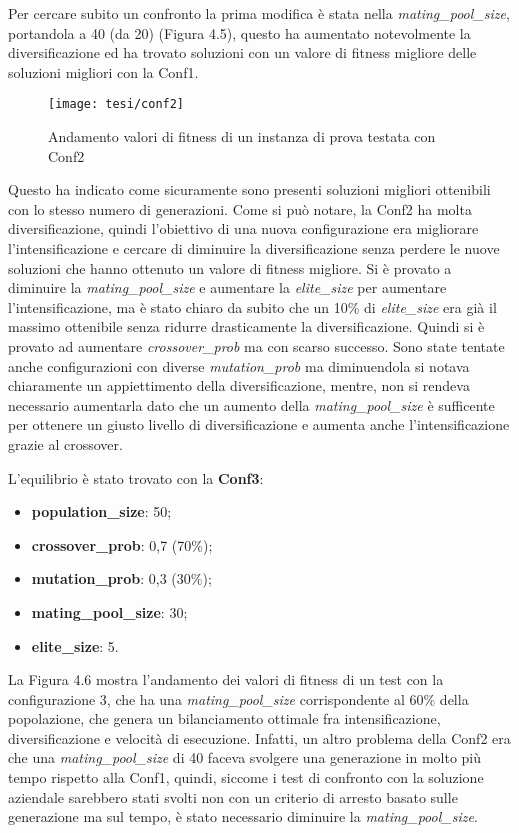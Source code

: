 Per cercare subito un confronto la prima modifica è stata nella \emph{mating\_pool\_size}, portandola a 40 (da 20) (Figura 4.5), questo ha aumentato notevolmente la diversificazione ed ha trovato soluzioni con un valore di fitness migliore delle soluzioni migliori con la Conf1. 

\begin{figure}[!ht] 
    \centering 
    \texttt{[image: tesi/conf2]} 
    \caption{Andamento valori di fitness di un instanza di prova testata con Conf2}
\end{figure}

Questo ha indicato come sicuramente sono presenti soluzioni migliori ottenibili con lo stesso numero di generazioni. Come si può notare, la Conf2 ha molta diversificazione, quindi l'obiettivo di una nuova configurazione era migliorare l'intensificazione e cercare di diminuire la diversificazione senza perdere le nuove soluzioni che hanno ottenuto un valore di fitness migliore. Si è provato a diminuire la \emph{mating\_pool\_size} e aumentare la \emph{elite\_size} per aumentare l'intensificazione, ma è stato chiaro da subito che un 10\% di \emph{elite\_size} era già il massimo ottenibile senza ridurre drasticamente la diversificazione. Quindi si è provato ad aumentare \emph{crossover\_prob} ma con scarso successo. Sono state tentate anche configurazioni con diverse \emph{mutation\_prob} ma diminuendola si notava chiaramente un appiettimento della diversificazione, mentre, non si rendeva necessario aumentarla dato che un aumento della \emph{mating\_pool\_size} è sufficente per ottenere un giusto livello di diversificazione e aumenta anche l'intensificazione grazie al crossover.

\noindent L'equilibrio è stato trovato con la \textbf{Conf3}:
\begin{itemize}
	\item\textbf{population\_size}: 50;
	\item\textbf{crossover\_prob}: 0,7 (70\%);
	\item\textbf{mutation\_prob}: 0,3 (30\%);
	\item\textbf{mating\_pool\_size}: 30;
	\item\textbf{elite\_size}: 5.
\end{itemize}

La Figura 4.6 mostra l'andamento dei valori di fitness di un test con la configurazione 3, che ha una \emph{mating\_pool\_size} corrispondente al 60\% della popolazione, che genera un bilanciamento ottimale fra intensificazione, diversificazione e velocità di esecuzione. Infatti, un altro problema della Conf2 era che una \emph{mating\_pool\_size} di 40 faceva svolgere una generazione in molto più tempo rispetto alla Conf1, quindi, siccome i test di confronto con la soluzione aziendale sarebbero stati svolti non con un criterio di arresto basato sulle generazione ma sul tempo, è stato necessario diminuire la \emph{mating\_pool\_size}.

